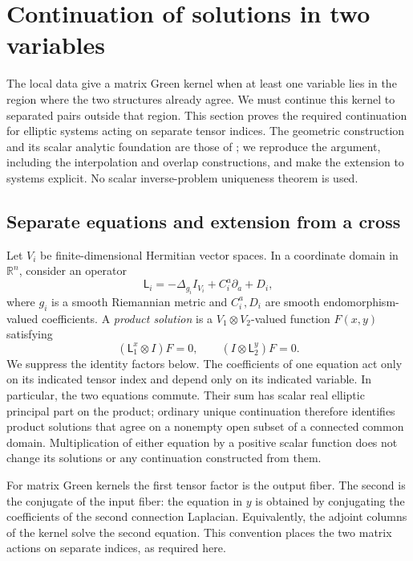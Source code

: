 \section{Continuation of solutions in two variables}
\label{cross:section}\label{sec:product}

The local data give a matrix Green kernel when at least one variable lies
in the region where the two structures already agree.  We must continue
this kernel to separated pairs outside that region.  This section proves
the required continuation for elliptic systems acting on separate tensor
indices.  The geometric construction and its scalar analytic foundation
are those of \cite[Section~3]{ScalarCompanion2026}; we reproduce the
argument, including the interpolation and overlap constructions, and
make the extension to systems explicit.  No scalar inverse-problem
uniqueness theorem is used.

\subsection{Separate equations and extension from a cross}

Let $V_i$ be finite-dimensional Hermitian vector spaces.  In a coordinate
domain in $\mathbb R^n$, consider an operator
\[
 \mathsf L_i=-\Delta_{g_i}I_{V_i}
                   +C_i^a\partial_a+D_i,
\]
where $g_i$ is a smooth Riemannian metric and $C_i^a,D_i$ are smooth
endomorphism-valued coefficients.  A \emph{product solution} is a
$V_1\otimes V_2$-valued function $F(x,y)$ satisfying
\[
 (\mathsf L_1^x\otimes I)F=0,
 \qquad (I\otimes\mathsf L_2^y)F=0.
\]
We suppress the identity factors below.  The coefficients of one equation
act only on its indicated tensor index and depend only on its indicated
variable.  In particular, the two equations commute.  Their sum has
scalar real elliptic principal part on the product; ordinary unique
continuation therefore identifies product solutions that agree on a
nonempty open subset of a connected common domain.  Multiplication of
either equation by a positive scalar function does not change its
solutions or any continuation constructed from them.

For matrix Green kernels the first tensor factor is the output fiber.
The second is the conjugate of the input fiber: the equation in $y$ is
obtained by conjugating the coefficients of the second connection
Laplacian.  Equivalently, the adjoint columns of the kernel solve the
second equation.  This convention places the two matrix actions on
separate indices, as required here.

